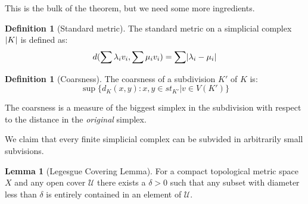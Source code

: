 \documentclass[11pt,a4paper, titlepage]{article}
\DeclarePairedDelimiter\abs{\lvert}{\rvert}
\theoremstyle{definition}
\newtheorem{definition}[theorem]{Definition}
\newtheorem{lemma}[theorem]{Lemma}
\begin{document}
This is the bulk of the theorem, but we need some more ingredients.

\begin{definition}[Standard metric]
The standard metric on a simplicial complex $\abs{K}$ is defined as:
\[
	d(\sum \lambda_i v_i, \sum \mu_i v_i) = \sum \abs{\lambda_i - \mu_i}
\]
\end{definition}

\begin{definition}[Coarsness]
The coarsness of a subdivision $K'$ of $K$ is:
\[
	\sup \{d_K(x,y) \colon x, y \in st_{K'} | v \in V(K')\}
\]
\end{definition}

The coarsness is a measure of the biggest simplex in the subdivision with respect to the distance in the \emph{original} simplex.

We claim that every finite simplicial complex can be subvided in arbitrarily small subvisions.

\begin{lemma}[Legesgue Covering Lemma]
For a compact topological metric space $X$ and any open cover $\mathcal{U}$ there exists a $\delta > 0$ such that any subset with diameter less than $\delta$ is entirely contained in an element of $\mathcal{U}$.
\end{lemma}
\end{document}
